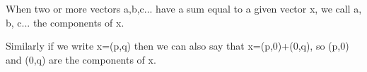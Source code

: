 When two or more vectors a,b,c... have a sum equal to a given vector x,
we call a, b, c... the components of x.
\par
Similarly if we write x=(p,q) then we can also say that x=(p,0)+(0,q),
so (p,0) and (0,q) are the components of x.